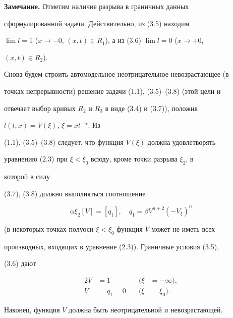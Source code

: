 \medskip 


 


{\bf Замечание.} Отметим наличие разрыва в граничных данных 


сформулированной задачи. Действительно, из (3.5) находим 


$\lim l=1$ ($x\to-0$, $(x,t)\in R_1$), а из (3.6) $\lim l=0$ ($x\to+0$, 


$(x,t)\in R_2$). 


\medskip 


 


Снова будем строить автомодельное неотрицательное невозрастающее (в 


точках непрерывности) решение задачи (1.1), (3.5)--(3.8) (этой цели и 


отвечает выбор кривых $R_2$ и $R_3$ в виде (3.4) и (3.7)), положив 


$l(t,x)=V(\xi)$, $\xi=x t^{-\alpha}$. Из 


(1.1), (3.5)--(3.8) следует, что функция $V(\xi)$ должна удовлетворять 


уравнению (2.3) при $\xi<\xi_0$ всюду, кроме точки разрыва $\xi_2$, в 


которой в силу 


(3.7), (3.8) должно выполняться соотношение 


\begin{equation} 


\alpha\xi_2[V]=[q_1],\quad q_1=\beta V^{n+2}(-V_\xi)^n\tag{3.9} 


\end{equation} 


(в некоторых точках полуоси $\xi<\xi_0$ функция $V$ может не иметь всех 


производных, входящих в уравнение (2.3)). Граничные условия (3.5), 


(3.6) дают 


\begin{alignat}{2} 


V&=1 &\quad (\xi&=-\infty),\tag{3.10}\\ 


V&=q_1=0 &\quad (\xi&=\xi_0).\tag{3.11} 


\end{alignat} 


Наконец, функция $V$ должна быть неотрицательной и невозрастающей. 


 



